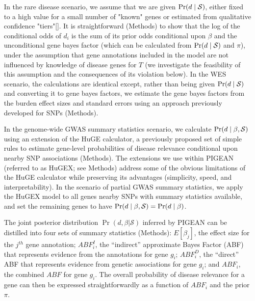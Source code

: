 In the rare disease scenario, we assume that we are given $\text{Pr}(d \mid \mathcal{S})$, either fixed to a high value for a small number of "known" genes or estimated from qualitative confidence "tiers"[].  It is straightforward (Methods) to show that the log of the conditional odds of $d_i$ is the sum of its prior odds conditional upon $\beta$ and the unconditional gene bayes factor (which can be calculated from $\text{Pr}(d \mid \mathcal{S})$ and $\pi$), under the assumption that gene annotations included in the model are not influenced by knowledge of disease genes for $T$ (we investigate the feasibility of this assumption and the consequences of its violation below). In the WES scenario, the calculations are identical except, rather than being given $\text{Pr}(d \mid \mathcal{S})$ and converting it to gene bayes factors, we estimate the gene bayes factors from the burden effect sizes and standard errors using an approach previously developed for SNPs (Methods).

In the genome-wide GWAS summary statistics scenario, we calculate $\text{Pr}(d \mid \beta, \mathcal{S})$ using an extension of the HuGE calculator, a previously proposed set of simple rules to estimate gene-level probabilities of disease relevance conditional upon nearby SNP associations (Methods). The extensions we use within PIGEAN (referred to as HuGEX; see Methods) address some of the obvious limitations of the HuGE calculator while preserving its advantages (simplicity, speed, and interpretability). In the  scenario of partial GWAS summary statistics, we apply the HuGEX model to all genes nearby SNPs with summary statistics available, and set the remaining genes to have $\text{Pr}(d \mid \beta, \mathcal{S})=\text{Pr}(d \mid \beta)$. 

The joint posterior distribution $\Pr(d,\beta|\mathcal{S})$ inferred by PIGEAN can be distilled into four sets of summary statistics (Methods): $E[\beta_j]$, the effect size for the $j^{th}$  gene annotation; $ABF^I_i$, the “indirect” approximate Bayes Factor (ABF) that represents evidence from the annotations for gene $g_i$; $ABF^D_i$, the “direct” ABF that represents evidence from genetic associations for gene $g_i$; and $ABF_i$, the combined $ABF$ for gene $g_i$. The overall probability of disease relevance for a gene can then be expressed straightforwardly as a function of $ABF_i$ and the prior $\pi$. 

